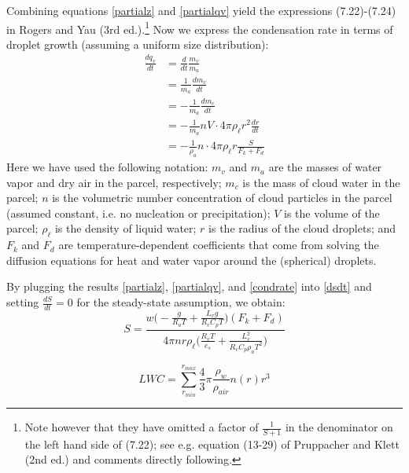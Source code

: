 \documentclass{article}
\begin{document}
Combining equations \eqref{partialz} and \eqref{partialqv} yield the expressions (7.22)-(7.24) in Rogers and Yau (3rd ed.).\footnote{Note however that they have omitted a factor of $\frac{1}{S+1}$ in the denominator on the left hand side of (7.22); see e.g. equation (13-29) of Pruppacher and Klett (2nd ed.) and comments directly following.}
Now we express the condensation rate in terms of droplet growth (assuming a uniform size distribution):
\begin{align}
\label{condrate}
\frac{dq_v}{dt} &= \frac{d}{dt}\frac{m_v}{m_a}\nonumber\\
&=\frac{1}{m_a}\frac{dm_v}{dt}\nonumber\\
&=-\frac{1}{m_a}\frac{dm_c}{dt}\nonumber\\
&=-\frac{1}{m_a}nV\cdot4\pi\rho_{\ell}r^2\frac{dr}{dt}\nonumber\\
&=-\frac{1}{\rho_a}n\cdot4\pi\rho_{\ell}r\frac{S}{F_k + F_d} 
\end{align}
Here we have used the following notation: $m_v$ and $m_a$ are the masses of water vapor and dry air in the parcel, respectively; $m_c$ is the mass of cloud water in the parcel; $n$ is the volumetric number concentration of cloud particles in the parcel (assumed constant, i.e. no nucleation or precipitation); $V$ is the volume of the parcel; $\rho_{\ell}$ is the density of liquid water; $r$ is the radius of the cloud droplets; and $F_k$ and $F_d$ are temperature-dependent coefficients that come from solving the diffusion equations for heat and water vapor around the (spherical) droplets.

By plugging the results \eqref{partialz}, \eqref{partialqv}, and \eqref{condrate} into \eqref{dsdt} and setting $\frac{dS}{dt}=0$ for the steady-state assumption, we obtain:
\begin{equation}
S = \frac{w\Big(-\frac{g}{R_aT} + \frac{L_vg}{R_vC_pT}\Big)(F_k + F_d)}{4\pi nr\rho_{\ell}\Big(\frac{R_vT}{e_s} + \frac{L_v^2}{R_vC_p\rho_aT^2}\Big)}
\end{equation}

\begin{equation}
LWC = \sum\limits_{r_{min}}^{r_{max}}\frac{4}{3}\pi \frac{\rho_{w}}{\rho_{air}}n(r)r^3
\end{equation}
\end{document}
